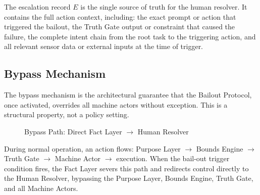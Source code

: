 The escalation record $E$ is the single source of truth for the human resolver. It contains the full action context, including: the exact prompt or action that triggered the bailout, the Truth Gate output or constraint that caused the failure, the complete intent chain from the root task to the triggering action, and all relevant sensor data or external inputs at the time of trigger.

\subsection{Bypass Mechanism}
\label{sec:bypass}

The bypass mechanism is the architectural guarantee that the Bailout Protocol, once activated, overrides all machine actors without exception. This is a structural property, not a policy setting.

\begin{figure}[H]
\centering
{}
\caption{Bypass Path: Direct Fact Layer $\rightarrow$ Human Resolver}
\label{fig:bypass}
\end{figure}

During normal operation, an action flows: Purpose Layer $\rightarrow$ Bounds Engine $\rightarrow$ Truth Gate $\rightarrow$ Machine Actor $\rightarrow$ execution. When the bail-out trigger condition fires, the Fact Layer severs this path and redirects control directly to the Human Resolver, bypassing the Purpose Layer, Bounds Engine, Truth Gate, and all Machine Actors.

